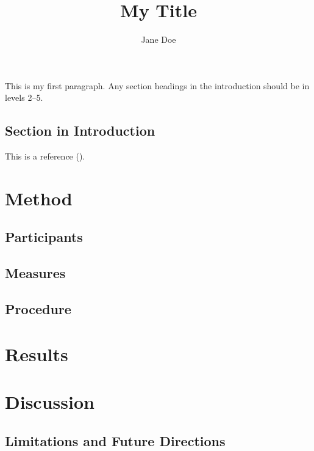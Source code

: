 \documentclass[
  man,
  longtable,
  nolmodern,
  notxfonts,
  notimes,
  colorlinks=true,linkcolor=blue,citecolor=blue,urlcolor=blue]{apa7}
\title{My Title}
\author{Jane Doe}
\affiliation{
{Department of Scholarly Studies, Generic University}}
\begin{document}
\maketitle




\setlength\LTleft{0pt}




This is my first paragraph. Any section headings in the introduction
should be in levels 2--5.

\subsection{Section in Introduction}\label{section-in-introduction}

This is a reference ().

\section{Method}\label{method}

\subsection{Participants}\label{participants}

\subsection{Measures}\label{measures}

\subsection{Procedure}\label{procedure}

\section{Results}\label{results}

\section{Discussion}\label{discussion}

\subsection{Limitations and Future
Directions}\label{limitations-and-future-directions}
\end{document}
